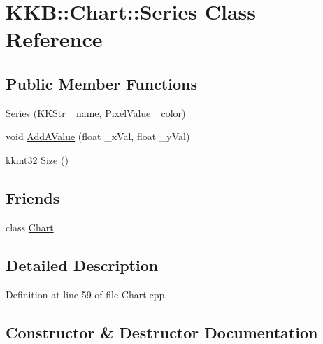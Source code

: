 \hypertarget{class_k_k_b_1_1_chart_1_1_series}{}\section{K\+KB\+:\+:Chart\+:\+:Series Class Reference}
\label{class_k_k_b_1_1_chart_1_1_series}
\subsection*{Public Member Functions}
\begin{DoxyCompactItemize}
\item 
\hyperlink{class_k_k_b_1_1_chart_1_1_series_a969f40dbaca55129baf3b9ab86be0ab3}{Series} (\hyperlink{class_k_k_b_1_1_k_k_str}{K\+K\+Str} \+\_\+name, \hyperlink{class_k_k_b_1_1_pixel_value}{Pixel\+Value} \+\_\+color)
\item 
void \hyperlink{class_k_k_b_1_1_chart_1_1_series_ab4f946ab502be405353a54f54def5aff}{Add\+A\+Value} (float \+\_\+x\+Val, float \+\_\+y\+Val)
\item 
\hyperlink{namespace_k_k_b_a8fa4952cc84fda1de4bec1fbdd8d5b1b}{kkint32} \hyperlink{class_k_k_b_1_1_chart_1_1_series_aa2e62bab6f5f125aab6e2184c6231610}{Size} ()
\end{DoxyCompactItemize}
\subsection*{Friends}
\begin{DoxyCompactItemize}
\item 
class \hyperlink{class_k_k_b_1_1_chart_1_1_series_a3143793912f47f1c0340d5a92a5184fe}{Chart}
\end{DoxyCompactItemize}


\subsection{Detailed Description}


Definition at line 59 of file Chart.\+cpp.



\subsection{Constructor \& Destructor Documentation}
